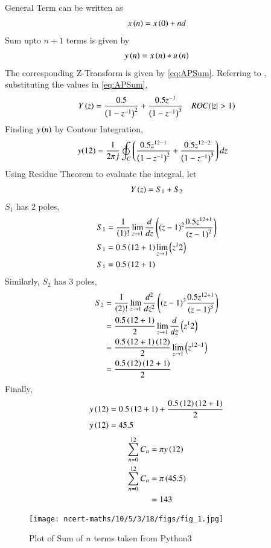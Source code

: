 \documentclass[journal,12pt,twocolumn]{IEEEtran}
\theoremstyle{remark}
\begin{document}
General Term can be written as 
\begin{align}
    x\left(n\right) = x\left(0\right) + nd
\end{align}
Sum upto $n + 1$ terms is given by
\begin{align}
    y\left(n\right) = x\left(n\right)*u\left(n\right)
\end{align}
The corresponding Z-Transform is given by \eqref{eq:APSum}.
Referring to , substituting the values in \eqref{eq:APSum}, 
\begin{align}
    Y\left(z\right) = \frac{0.5}{\left(1 - z^{-1}\right)^2} + \frac{0.5z^{-1}}{\left(1-z^{-1}\right)^3} \quad ROC(\left\vert z\right\vert > 1)
\end{align}
Finding $y\left(n\right)$ by Contour Integration, 
\begin{align}
     y(12)&=\frac{1}{2\pi j}\oint_{C}\left(\dfrac{0.5z^{12-1}}{\left(1-z^{-1}\right)^2} + \dfrac{0.5z^{12-2}}{\left(1-z^{-1}\right)^{3}}\right)dz  
\end{align}
Using Residue Theorem to evaluate the integral, let 
\begin{align}
    Y\left(z\right) = S_{1} + S_{2}
\end{align}
$S_{1}$ has 2 poles,
\begin{align}
    S_{1} &= \frac{1}{\left(1\right)!}\lim\limits_{z\to 1}\frac{d}{dz}\left({(z-1)}^{2}\frac{0.5z^{12+1}}{{(z-1)}^2}\right)\\
    S_{1} &= 0.5\left(12+1\right)\lim\limits_{z\to 1}\left(z^12\right)\\
    S_{1} &=0.5\left(12+1\right)
\end{align}
Similarly, $S_{2}$ has 3 poles, 
\begin{align}
    S_{2}&=\frac{1}{\left(2\right)!}\lim\limits_{z\to 1}\frac{d^{2}}{dz^{2}}\left({(z-1)}^{3}\frac{0.5z^{12+1}}{{(z-1)}^3}\right)\\
    &=\frac{0.5\left(12+1\right)}{2}\lim\limits_{z\to 1}\frac{d}{dz}\left(z^12\right)\\
    &=\frac{0.5\left(12+1\right)\left(12\right)}{2}\lim\limits_{z\to 1}\left(z^{12-1}\right)\\
    &=\frac{0.5\left(12\right)\left(12+1\right)}{2}
\end{align}
Finally, 
\begin{align}
    y\left(12\right) &= 0.5\left(12+1\right) + \frac{0.5\left(12\right)\left(12+1\right)}{2}\\
    y\left(12\right) &= 45.5
\end{align}
\begin{align}
    \sum_{n = 0}^{12}C_{n} &= \pi y\left(12\right)\\
    \sum_{n = 0}^{12}C_{n} &= \pi \left(45.5\right)\\
                           &= 143
\end{align}

\begin{figure}[h]
\renewcommand\thefigure{1}
    \centering
    \texttt{[image: ncert-maths/10/5/3/18/figs/fig\_1.jpg]}
    \caption{Plot of Sum of $n$ terms taken from Python3}
    \label{fig_2}
\end{figure}
\end{document}
